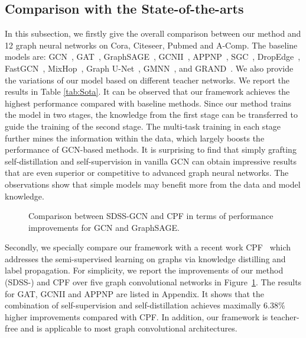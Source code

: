\documentclass[letterpaper]{article} \usepackage{aaai22} \usepackage{times} \usepackage{helvet} \usepackage{courier} \usepackage[hyphens]{url} \usepackage{graphicx} \urlstyle{rm} \def\UrlFont{\rm} \usepackage{subfigure}
\begin{document}
	\subsection{Comparison with the State-of-the-arts}
	
	In this subsection, we firstly give the overall comparison between our method and 12 graph neural networks on Cora, Citeseer, Pubmed and A-Comp. The baseline models are: GCN~\cite{kipf2016semiGCN}, GAT~\cite{velivckovic2017GAT}, GraphSAGE~\cite{Hamilton2017GraphSAGE}, GCNII~\cite{chen2020GCNII}, APPNP~\cite{Klicpera2019APPNP}, SGC~\cite{wu2019SGCNs}, DropEdge~\cite{rong2020dropedge}, FastGCN~\cite{chen2018fastgcn}, MixHop~\cite{abuelhaija2019mixhop}, Graph U-Net~\cite{gao2019graphUNets}, GMNN~\cite{qu2019gmnn}, and GRAND~\cite{feng2020grand}.
	We also provide the variations of our model based on different teacher networks. We report the results in Table \ref{tab:Sota}. It can be observed that our framework achieves the highest performance compared with baseline methods. Since our method trains the model in two stages, the knowledge from the first stage can be transferred to guide the training of the second stage. The multi-task training in each stage further mines the information within the data, which largely boosts the performance of GCN-based methods. It is surprising to find that simply grafting self-distillation and self-supervision in vanilla GCN can obtain impressive results that are even superior or competitive to advanced graph neural networks. The observations show that simple models may benefit more from the data and model knowledge.
	
	
	\begin{figure}[!h]
		\centering
		\label{ImpvGCN}
		\label{ImpSAGE}
		\caption{Comparison between SDSS-GCN and CPF in terms of performance improvements for GCN and GraphSAGE.}
		\label{fig:Impv}
	\end{figure}
	
	Secondly, we specially compare our framework with a recent work CPF~\cite{Yang2021CPF} which addresses the semi-supervised learning on graphs via knowledge distilling and label propagation. For simplicity, we report the improvements of our method (SDSS-) and CPF over five graph convolutional networks in Figure~\ref{fig:Impv}. The results for GAT, GCNII and APPNP are listed in Appendix. It shows that the combination of self-supervision and self-distillation achieves maximally 6.38\% higher improvements compared with CPF. In addition, our framework is teacher-free and is applicable to most graph convolutional architectures.
	
\end{document}
